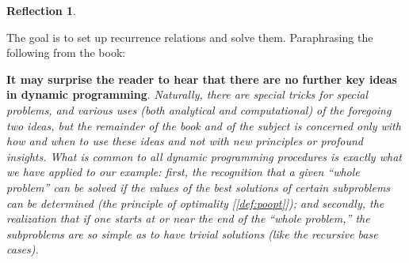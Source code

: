 \documentclass[english,notitlepage,smartquotes]{hgbreport}
\theoremstyle{definition}
\theoremstyle{definition}
\theoremstyle{remark}
\theoremstyle{definition}
\theoremstyle{plain}
\theoremstyle{definition}
\newtheorem{reflection}{Reflection}
\begin{document}
\begin{reflection}
\begin{sidebar}
The goal is to set up recurrence relations and solve them. Paraphrasing the following from the book:

\textbf{It may surprise the reader to hear that there are no further key ideas in dynamic programming}. \emph{Naturally, there are special tricks for special problems, and various uses (both analytical and computational) of the foregoing two ideas, but the remainder of the book and of the subject is concerned only with how and when to use these ideas and not with new principles or profound insights. What is common to all dynamic programming procedures is exactly what we have applied to our example: first, the recognition that a given “whole problem” can be solved if the values of the best solutions of certain subproblems can be determined (the principle of optimality [\ref{def:poopt}]); and secondly, the realization that if one starts at or near the end of the ``whole problem,'' the subproblems are so simple as to have trivial solutions (like the recursive base cases).}
\end{sidebar}
\end{reflection}
\end{document}
